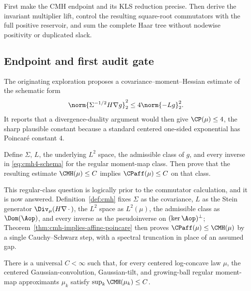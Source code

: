 \documentclass[../../main.tex]{subfiles}
\begin{document}
\begin{program}
\label{prog:cmh-route}
First make the CMH endpoint and its KLS reduction precise. Then derive the invariant multiplier
lift, control the resulting square-root commutators with the full positive reservoir, and sum the
complete Haar tree without nodewise positivity or duplicated slack.
\end{program}

\subsection{Endpoint and first audit gate}

The originating exploration proposes a covariance--moment--Hessian estimate of the schematic
form
\begin{equation}
  \norm{\Sigma^{-1/2}H\nabla g}_2^2
  \le4\norm{-Lg}_2^2.
  \label{eq:cmh4-schema}
\end{equation}
It reports that a divergence-duality argument would then give $\CP(\mu)\le4$, the sharp plausible
constant because a standard centered one-sided exponential has Poincar\'e constant $4$.

\begin{remark}
\label{q:cmh-normalization}
Define $\Sigma$, $L$, the underlying $L^2$ space, the admissible class of $g$, and every inverse
in \eqref{eq:cmh4-schema} for the regular moment-map class. Then prove that the resulting
estimate $\CMH(\mu)\le C$ implies $\CPaff(\mu)\le C$ on that class.
\end{remark}

This regular-class question is logically prior to the commutator calculation, and it is now
answered.
Definition~\ref{def:cmh} fixes $\Sigma$ as the covariance, $L$ as the Stein generator
$\Div_\mu(H\nabla\,\cdot\,)$, the $L^2$ space as $L^2(\mu)$, the admissible class as
$\Dom(\Aop)$, and every inverse as the pseudoinverse on $(\ker\Aop)^\perp$;
Theorem~\ref{thm:cmh-implies-affine-poincare} then proves
$\CPaff(\mu)\le\CMH(\mu)$ by a single Cauchy--Schwarz step, with a spectral truncation in place
of an assumed gap.

\begin{assumption}
\label{ass:uniform-cmh-approximants}
There is a universal $C<\infty$ such that, for every centered log-concave law $\mu$, the
centered Gaussian-convolution, Gaussian-tilt, and growing-ball regular moment-map approximants
$\mu_k$ satisfy $\sup_k\CMH(\mu_k)\le C$.
\end{assumption}
\end{document}
